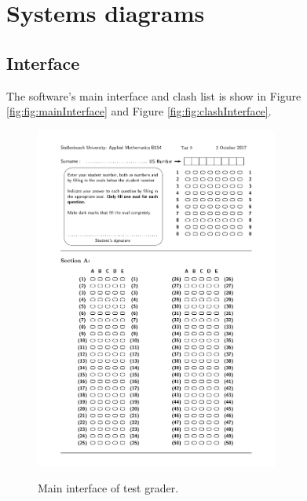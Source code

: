 \chapter{Systems diagrams}
\label{ap:Algorithms}
\graphicspath{{Appendix4/Appendix4figures/}}

\section{Interface}

The software's main interface and clash list is show in Figure \ref{fig:fig:mainInterface} and Figure \ref{fig:fig:clashInterface}.

\begin{figure}
  \centering
  \includegraphics[width=8cm]{mainInterface}\\
  \caption{Main interface of test grader.}
  \label{fig:mainInterface}
\end{figure}

